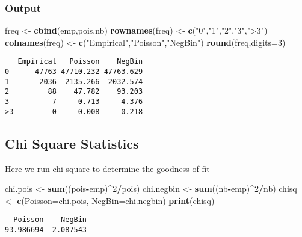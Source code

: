 \documentclass[]{book}
\newenvironment{Shaded}{\begin{snugshade}}{\end{snugshade}}
\newcommand{\KeywordTok}[1]{\textcolor[rgb]{0.13,0.29,0.53}{\textbf{#1}}}
\newcommand{\DataTypeTok}[1]{\textcolor[rgb]{0.13,0.29,0.53}{#1}}
\newcommand{\DecValTok}[1]{\textcolor[rgb]{0.00,0.00,0.81}{#1}}
\newcommand{\StringTok}[1]{\textcolor[rgb]{0.31,0.60,0.02}{#1}}
\newcommand{\OperatorTok}[1]{\textcolor[rgb]{0.81,0.36,0.00}{\textbf{#1}}}
\newcommand{\NormalTok}[1]{#1}
\theoremstyle{definition}
\theoremstyle{definition}
\theoremstyle{definition}
\theoremstyle{remark}
\begin{document}
\subsubsection{Output}\label{output}

\begin{Shaded}
\begin{Highlighting}[]
\NormalTok{freq <-}\StringTok{ }\KeywordTok{cbind}\NormalTok{(emp,pois,nb)}
\KeywordTok{rownames}\NormalTok{(freq) <-}\StringTok{ }\KeywordTok{c}\NormalTok{(}\StringTok{"0"}\NormalTok{,}\StringTok{"1"}\NormalTok{,}\StringTok{"2"}\NormalTok{,}\StringTok{"3"}\NormalTok{,}\StringTok{">3"}\NormalTok{)}
\KeywordTok{colnames}\NormalTok{(freq) <-}\StringTok{ }\KeywordTok{c}\NormalTok{(}\StringTok{"Empirical"}\NormalTok{,}\StringTok{"Poisson"}\NormalTok{,}\StringTok{"NegBin"}\NormalTok{)}
\KeywordTok{round}\NormalTok{(freq,}\DataTypeTok{digits=}\DecValTok{3}\NormalTok{)}
\end{Highlighting}
\end{Shaded}

\begin{verbatim}
   Empirical   Poisson    NegBin
0      47763 47710.232 47763.629
1       2036  2135.266  2032.574
2         88    47.782    93.203
3          7     0.713     4.376
>3         0     0.008     0.218
\end{verbatim}

\subsection{Chi Square Statistics}\label{chi-square-statistics}

Here we run chi square to determine the goodness of fit

\begin{Shaded}
\begin{Highlighting}[]
\NormalTok{chi.pois <-}\StringTok{ }\KeywordTok{sum}\NormalTok{((pois}\OperatorTok{-}\NormalTok{emp)}\OperatorTok{^}\DecValTok{2}\OperatorTok{/}\NormalTok{pois)}
\NormalTok{chi.negbin <-}\StringTok{ }\KeywordTok{sum}\NormalTok{((nb}\OperatorTok{-}\NormalTok{emp)}\OperatorTok{^}\DecValTok{2}\OperatorTok{/}\NormalTok{nb)}
\NormalTok{chisq <-}\StringTok{ }\KeywordTok{c}\NormalTok{(}\DataTypeTok{Poisson=}\NormalTok{chi.pois, }\DataTypeTok{NegBin=}\NormalTok{chi.negbin)}
\KeywordTok{print}\NormalTok{(chisq)}
\end{Highlighting}
\end{Shaded}

\begin{verbatim}
  Poisson    NegBin 
93.986694  2.087543 
\end{verbatim}
\end{document}
